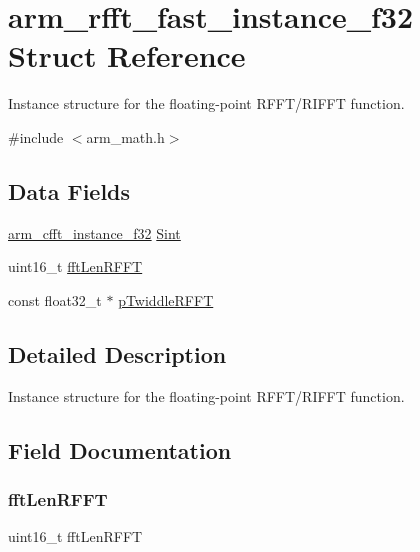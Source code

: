 \hypertarget{structarm__rfft__fast__instance__f32}{}\section{arm\+\_\+rfft\+\_\+fast\+\_\+instance\+\_\+f32 Struct Reference}
\label{structarm__rfft__fast__instance__f32}


Instance structure for the floating-\/point R\+F\+F\+T/\+R\+I\+F\+FT function.  




{\ttfamily \#include $<$arm\+\_\+math.\+h$>$}

\subsection*{Data Fields}
\begin{DoxyCompactItemize}
\item 
\mbox{\hyperlink{structarm__cfft__instance__f32}{arm\+\_\+cfft\+\_\+instance\+\_\+f32}} \mbox{\hyperlink{structarm__rfft__fast__instance__f32_aa8a05a9fabc3852e5d476152a5067e53}{Sint}}
\item 
uint16\+\_\+t \mbox{\hyperlink{structarm__rfft__fast__instance__f32_a174f8c72d545034e19ba4ced52b31353}{fft\+Len\+R\+F\+FT}}
\item 
const float32\+\_\+t $\ast$ \mbox{\hyperlink{structarm__rfft__fast__instance__f32_ae701bffa723225a574f41989e62cff2e}{p\+Twiddle\+R\+F\+FT}}
\end{DoxyCompactItemize}


\subsection{Detailed Description}
Instance structure for the floating-\/point R\+F\+F\+T/\+R\+I\+F\+FT function. 

\subsection{Field Documentation}
\mbox{\label{structarm__rfft__fast__instance__f32_a174f8c72d545034e19ba4ced52b31353}} 
\subsubsection{\texorpdfstring{fftLenRFFT}{fftLenRFFT}}
{\footnotesize\ttfamily uint16\+\_\+t fft\+Len\+R\+F\+FT}

